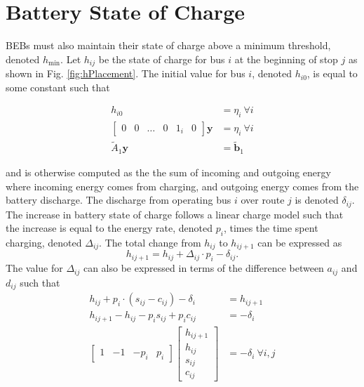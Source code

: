 \section{Battery State of Charge\label{sec:5_battery}}
BEBs must also maintain their state of charge above a minimum threshold, denoted $h_{\text{min}}$. Let $h_{ij}$ be the state of charge for bus $i$ at the beginning of stop $j$ as shown in Fig. \ref{fig:hPlacement}. The initial value for bus $i$, denoted $h_{i0}$, is equal to some constant such that

\begin{equation}\label{eqn:initialSoc0}\begin{aligned}
	h_{i0} &= \eta_{i} \ \forall i \\
	\begin{bmatrix}0 & 0 & \hdots & 0 & 1_i& 0 \end{bmatrix}\mathbf{y} &= \eta_i \ \forall i \\
		\tilde{A}_1\mathbf{y} &= \tilde{\mathbf{b}}_1
\end{aligned} \end{equation}

and is otherwise computed as the the sum of incoming and outgoing energy where incoming energy comes from charging, and outgoing energy comes from the battery discharge. The discharge from operating bus $i$ over route $j$ is denoted $\delta_{ij}$. The increase in battery state of charge follows a linear charge model such that the increase is equal to the energy rate, denoted $p_i$, times the time spent charging, denoted $\Delta_{ij}$\cite{rong_coordinated_2016}.
The total change from $h_{ij}$ to $h_{ij+1}$ can be expressed as
\begin{equation}
	h_{ij+1} = h_{ij} + \Delta_{ij} \cdot p_i - \delta_{ij}.
\end{equation}
The value for $\Delta_{ij}$ can also be expressed in terms of the difference between $a_{ij}$ and $d_{ij}$ such that
\begin{equation}\label{eqn:socDynamic1}\begin{aligned}
	h_{ij} + p_i\cdot \left ( s_{ij} - c_{ij} \right ) - \delta_i &= h_{ij+1}\\
	h_{ij+1} - h_{ij} - p_is_{ij} + p_ic_{ij} &= -\delta_i\\
	\begin{bmatrix} 1 & -1 & -p_i & p_i\end{bmatrix} \begin{bmatrix}h_{ij+1} \\ h_{ij} \\ s_{ij} \\ c_{ij} \end{bmatrix} &= -\delta_i \ \forall i,j
\end{aligned}\end{equation}

